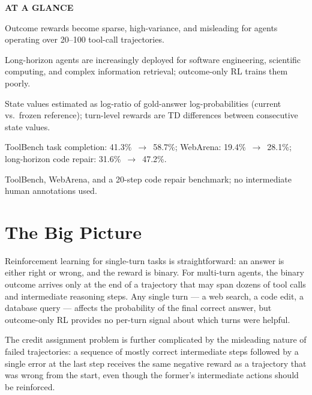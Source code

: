 \documentclass[10pt,twocolumn]{article}
\begin{document}
\begin{mdframed}[backgroundcolor=boxgray,linecolor=rulered,linewidth=1pt,
    innerleftmargin=6pt,innerrightmargin=6pt,
    innertopmargin=6pt,innerbottommargin=6pt]
\textbf{\small AT A GLANCE}\par\vspace{4pt}
\begin{description}[leftmargin=0pt,labelsep=4pt,itemsep=2pt,parsep=0pt,
    font=\small\bfseries]
  \item[Problem:] Outcome rewards become sparse, high-variance, and
    misleading for agents operating over 20--100 tool-call trajectories.
  \item[Why it matters:] Long-horizon agents are increasingly deployed
    for software engineering, scientific computing, and complex
    information retrieval; outcome-only RL trains them poorly.
  \item[Method:] State values estimated as log-ratio of gold-answer
    log-probabilities (current vs.\ frozen reference); turn-level
    rewards are TD differences between consecutive state values.
  \item[Result:] ToolBench task completion: 41.3\%~$\to$~58.7\%;
    WebArena: 19.4\%~$\to$~28.1\%; long-horizon code repair: 31.6\%~$\to$~47.2\%.
  \item[Evidence:] ToolBench, WebArena, and a 20-step code repair
    benchmark; no intermediate human annotations used.
\end{description}
\end{mdframed}

\section{The Big Picture}

Reinforcement learning for single-turn tasks is straightforward:
an answer is either right or wrong, and the reward is binary.
For multi-turn agents, the binary outcome arrives only at the
end of a trajectory that may span dozens of tool calls and
intermediate reasoning steps. Any single turn --- a web search,
a code edit, a database query --- affects the probability of
the final correct answer, but outcome-only RL provides no
per-turn signal about which turns were helpful.

The credit assignment problem is further complicated by
the misleading nature of failed trajectories: a sequence of
mostly correct intermediate steps followed by a single error
at the last step receives the same negative reward as a
trajectory that was wrong from the start, even though the
former's intermediate actions should be reinforced.
\end{document}
